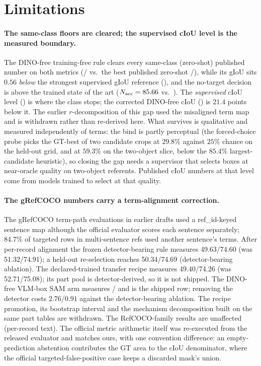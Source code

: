 \section{Limitations}
\label{sec:limitations}

\paragraph{The same-class floors are cleared; the supervised cIoU level is the measured boundary.}
The DINO-free training-free rule clears every same-class (zero-shot) published
number on both metrics (\grefCIoU{}/\grefGIoU{} vs.\ the best published
zero-shot \grefZeroShotCIoU{}/\grefZeroShotGIoU{}), while its gIoU sits
$0.56$ \emph{below} the strongest supervised gIoU reference
(\grefPubGIoU), and the no-target decision is above the trained state of the
art ($N_{\mathrm{acc}}=85.66$ vs.\ \wallTrainedNAcc). The
\emph{supervised} cIoU level (\grefPubCIoU) is where the class stops; the
corrected DINO-free cIoU (\grefCIoU) is $21.4$ points below it. The earlier
$r$-decomposition of this gap used the misaligned term map and is withdrawn
rather than re-derived here. What survives is qualitative and measured
independently of terms: the bind is partly perceptual (the forced-choice
probe picks the GT-best of two candidate crops at $29.8\%$ against $25\%$
chance on the held-out grid, and at $59.3\%$ on the two-object slice, below
the $85.4\%$ largest-candidate heuristic), so closing the gap needs a
supervisor that selects boxes at near-oracle quality on two-object
referents. Published cIoU numbers at that level come from models trained to
select at that quality.

\paragraph{The gRefCOCO numbers carry a term-alignment correction.}
The gRefCOCO term-path evaluations in earlier drafts used a ref\_id-keyed
sentence map although the official evaluator scores each sentence separately;
84.7\% of targeted rows in multi-sentence refs used another sentence's terms.
After per-record alignment the frozen detector-bearing rule measures
49.63/74.60 (was 51.32/74.91); a held-out re-selection reaches 50.34/74.69
(detector-bearing ablation). The declared-trained transfer recipe measures
49.40/74.26 (was 52.71/75.08); its part pool is detector-derived, so it is not
shipped. The DINO-free VLM-box SAM arm measures \grefCIoU{}/\grefGIoU{} and
is the shipped row; removing the detector costs $2.76$/$0.91$ against the
detector-bearing ablation. The recipe promotion, its bootstrap interval and
the mechanism decomposition built on the same part tables are withdrawn. The RefCOCO-family results are unaffected (per-record
text). The official metric arithmetic itself was re-executed from the
released evaluator and matches ours, with one convention difference: an
empty-prediction abstention contributes the GT area to the cIoU denominator,
where the official targeted-false-positive case keeps a discarded mask's
union.

